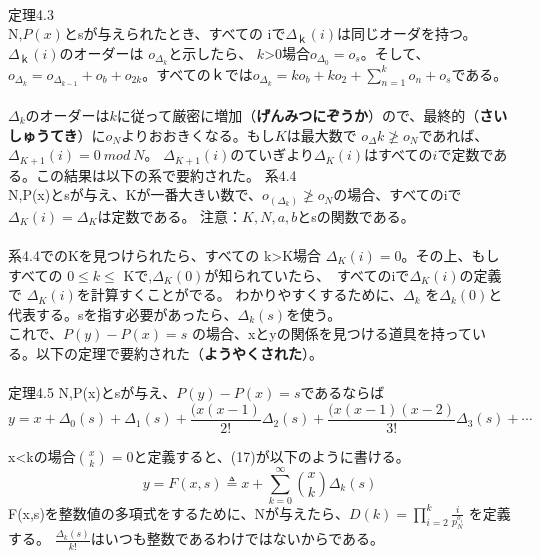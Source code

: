 \documentclass[24 pts]{article}
\begin{document}
\paragraph{}
定理4.3\\
N,$P(x)$とsが与えられたとき、すべての iで$\Delta_ｋ (i)$は同じオーダを持つ。$\Delta_ｋ (i)$のオーダーは $o_{\Delta_k}$と示したら、 $k$>0場合$o_{\Delta_0}= o_s$。そして、$o_{\Delta_k}=o_{\Delta_{k-1}}+o_b+o_{2k}$。すべてのｋでは$o_{\Delta_k}=ko_b+ko_2+\sum_{n=1}^k o_n  +o_s$である。

\paragraph{}
$\Delta_k$のオーダーは$k$に従って厳密に増加（\textbf{げんみつにぞうか}）ので、最終的（\textbf{さいしゅうてき}）に$o_N$よりおおきくなる。もし$K$は最大数で $o_\Delta k\ngeq o_N$であれば、 $\Delta_{K+1}(i)=0\ mod\ N$。 $\Delta_{K+1}(i)$のていぎより$\Delta_K(i)$はすべての$i$で定数である。この結果は以下の系で要約された。
系4.4\\
N,P(x)とsが与え、Kが一番大きい数で、$o_(\Delta_k)\ngeq o_N$の場合、すべてのiで $\Delta_K (i)= \Delta_K$は定数である。
注意：$K,N,a,b$とsの関数である。
\paragraph{}
系4.4でのKを見つけられたら、すべての k>K場合 $\Delta_K (i)=0$。その上、もしすべての $0\leq k\leq$ Kで,$\Delta_K (0) $が知られていたら、　すべてのiで$\Delta_K (i)$の定義で $\Delta_K (i)$を計算すくことがでる。
わかりやすくするために、$\Delta_k$ を$\Delta_k (0)$と代表する。sを指す必要があったら、$\Delta_k(s)$を使う。\\これで、$P(y)-P(x)=s$ の場合、xとyの関係を見つける道具を持っている。以下の定理で要約された（\textbf{ようやくされた}）。
\paragraph{}
定理4.5
N,P(x)とsが与え、$P(y)-P(x)=s$であるならば
\begin{equation}\tag{17}
y=x+\Delta_0 (s) +\Delta_1 (s)+\frac{(x(x-1)}{2!} \Delta_2 (s)+\frac{(x(x-1)(x-2)}{3!} \Delta_3(s)+⋯		
\end{equation}	

x<kの場合${x \choose k}=0$と定義すると、(17)が以下のように書ける。
\begin{equation}\tag{18}
y=F(x,s)\triangleq x+\sum_{k=0}^\infty {x \choose k} \Delta_k (s)	
\end{equation}					
F(x,s)を整数値の多項式をするために、Nが与えたら、$D(k)=\prod_{i=2}^k \frac{i}{p_N^{o_i}}$ を定義する。
$\frac{\Delta_k(s)}{k!}$はいつも整数であるわけではないからである。
\end{document}
